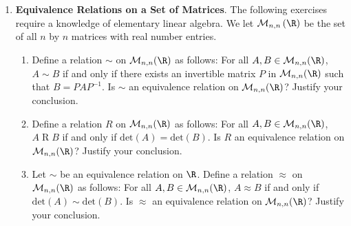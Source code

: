 \begin{enumerate}
\item \textbf{Equivalence Relations on a Set of Matrices}.  The following exercises require a knowledge of elementary linear algebra.  We let 
$\mathcal{M}_{n, n}\left( \R \right)$ be the set of all $n$ by $n$ matrices with real number entries.
\begin{enumerate}
\item Define a relation $\sim$ on $\mathcal{M}_{n, n}( \R )$ as follows:  For all 
$A, B \in \mathcal{M}_{n, n}( \R )$, $A \sim B$ if and only if there exists an invertible matrix $P$ in $\mathcal{M}_{n, n}( \R )$ such that $B = PAP^{-1}$.  Is $\sim$ an equivalence relation on 
$\mathcal{M}_{n, n}( \R )$?  Justify your conclusion.

\item Define a relation $R$ on $\mathcal{M}_{n, n} (\R )$ as follows:  For all 
$A, B \in \mathcal{M}_{n, n}( \R )$, $A \mathrel{R} B$ if and only if 
$\text{det}(A) = \text{det}(B)$.  Is $R$ an equivalence relation on 
$\mathcal{M}_{n, n}( \R )$? Justify your conclusion.

\item Let $\sim$ be an equivalence relation on $\R$.  Define a relation $\approx$ on 
$\mathcal{M}_{n, n}( \R )$ as follows:  For all 
$A, B \in \mathcal{M}_{n, n}( \R )$, $A \approx B$ if and only if 
$\text{det}(A) \sim \text{det}(B)$.  Is $\approx$ an equivalence relation on 
$\mathcal{M}_{n, n}( \R )$?  Justify your conclusion.
\end{enumerate}

\end{enumerate}


\hbreak


\endinput

\begin{center}
\setlength{\unitlength}{0.5cm}
\begin{picture}(8,10)
\put(2,2){\circle*{.25}}
\put(2,6){\circle*{.25}}
\put(6,2){\circle*{.25}}
\put(6,6){\circle*{.25}}
\put(4,8){\circle*{.25}}


\put(1.8,1.2){\emph{d}}
\put(5.8,1.2){\emph{e}}
\put(5.8,6.4){\emph{c}}
\put(1.5,6.3){\emph{b}}
\put(3.8,8.3){\emph{a}}

\put(2.3,1.8){\vector(1,0){3.4}}
\put(5.7,2.2){\vector(-1,0){3.4}}
\put(2.2,6.4){\vector(1,1){1.6}}
\put(3.8,7.6){\vector(-1,-1){1.6}}

\put(6,1){\circle{2}}
\put(6,2){\vector(1,0){0}}

\put(1.3,6.7){\circle{2}}
\put(2,6){\vector(1,1){0}}

\put(6,5){\circle{2}}
\put(6,6){\vector(1,0){0}}

\put(4,9){\circle{2}}
\put(4,8){\vector(1,0){0}}

\put(1.3,2.7){\circle{2}}
\put(2,2){\vector(1,1){0}}

\end{picture}
\end{center}

